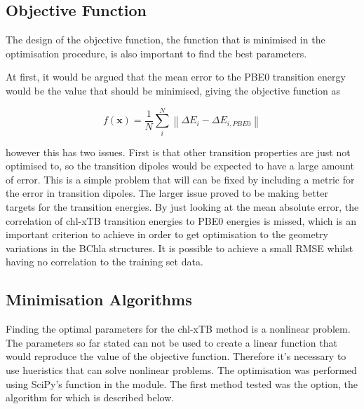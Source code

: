 \subsection{Objective Function}
\label{subsec:obj_func}
The design of the objective function, the function that is minimised in the optimisation
procedure, is also important to find the best parameters.

At first, it would be argued that the mean error to the PBE0 transition energy
would be the value that should be minimised, giving the objective function as

\begin{equation}
f\left(\mathbf{x}\right) = \frac{1}{N} \sum^N_i \left\| \Delta E_i  - \Delta E_{i, PBE0} \right\|
\end{equation}

however this has two issues. First is that other transition properties are just 
not optimised to, so the transition dipoles would be expected to have a large amount
of error. This is a simple problem that will can be fixed by including a metric
for the error in transition dipoles.
The larger issue proved to be making better targets for the transition energies.
By just looking at the mean absolute error, the correlation of chl-xTB transition 
energies to PBE0 energies is missed, which is an important criterion to achieve 
in order to get optimisation to the geometry variations in the BChla structures.
It is possible to achieve a small RMSE whilst having no correlation to the training
set data.



\subsection{Minimisation Algorithms}
\label{subsec:algorithms}
Finding the optimal parameters for the chl-xTB method is a nonlinear problem. The
parameters so far stated can not be used to create a linear function that would
reproduce the value of the objective function. Therefore it's necessary to use
hueristics that can solve nonlinear problems. 
The optimisation was performed using SciPy's  function in the 
 module. The first method tested was the  option,
the algorithm for which is described below.


